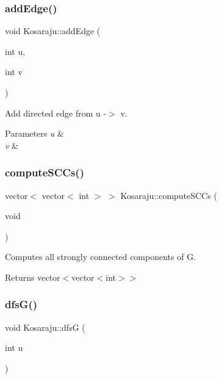 \subsubsection{\texorpdfstring{add\+Edge()}{addEdge()}}
{\footnotesize\ttfamily void Kosaraju\+::add\+Edge (\begin{DoxyParamCaption}\item[{int}]{u,  }\item[{int}]{v }\end{DoxyParamCaption})}



Add directed edge from u -\/$>$ v. 


\begin{DoxyParams}{Parameters}
{\em u} & \\
\hline
{\em v} & \\
\hline
\end{DoxyParams}
\mbox{\label{classKosaraju_ae283595a4b00f90229ebb6a2f8a66f61}} 
\subsubsection{\texorpdfstring{compute\+S\+C\+Cs()}{computeSCCs()}}
{\footnotesize\ttfamily vector$<$ vector$<$ int $>$ $>$ Kosaraju\+::compute\+S\+C\+Cs (\begin{DoxyParamCaption}\item[{void}]{ }\end{DoxyParamCaption})}



Computes all strongly connected components of G. 

\begin{DoxyReturn}{Returns}
vector$<$vector$<$int$>$$>$ 
\end{DoxyReturn}
\mbox{\label{classKosaraju_a0001d8a4780d0b7fced804ed3b1fc972}} 
\subsubsection{\texorpdfstring{dfs\+G()}{dfsG()}}
{\footnotesize\ttfamily void Kosaraju\+::dfsG (\begin{DoxyParamCaption}\item[{int}]{u }\end{DoxyParamCaption})\hspace{0.3cm}{\ttfamily [private]}}




